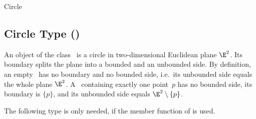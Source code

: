 
\ccAutoIndexingOff
\ccHtmlNoClassToc
\ccHtmlNoClassLinks
\ccHtmlNoClassIndex
\begin{ccClass}{Circle}
\subsection*{Circle Type (\ccClassTemplateName)}

\ccSaveThreeColumns
{}
\ccPropagateThreeToTwoColumns

\ccDefinition
 
An object of the class \ccClassName\ is a circle in two-dimensional
Euclidean plane $\E^2$. Its boundary splits the plane into a bounded
and an unbounded side. By definition, an empty \ccClassName\ has no
boundary and no bounded side, i.e.\ its unbounded side equals the
whole plane $\E^2$. A \ccClassName\ containing exactly one point~$p$
has no bounded side, its boundary is $\{p\}$, and its unbounded side
equals $\E^2 \setminus \{p\}$.

\ccTypes
 

The following type is only needed, if the member function 
of  is used.

 
\ccCreation
{}
 




\end{ccClass}
